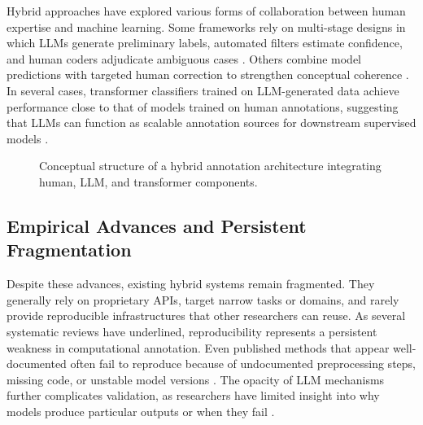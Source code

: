 \documentclass[12pt]{article}
\begin{document}
Hybrid approaches have explored various forms of collaboration between human expertise and machine learning. Some frameworks rely on multi-stage designs in which LLMs generate preliminary labels, automated filters estimate confidence, and human coders adjudicate ambiguous cases \parencite{wang_etal24a}. Others combine model predictions with targeted human correction to strengthen conceptual coherence \parencite{dreier_etal25}. In several cases, transformer classifiers trained on LLM-generated data achieve performance close to that of models trained on human annotations, suggesting that LLMs can function as scalable annotation sources for downstream supervised models \parencite{heseltineLargeLanguageModels2024, pangakisKnowledgeDistillationAutomated2024}. 

\begin{figure}[t!]
\centering
{}
\caption{Conceptual structure of a hybrid annotation architecture integrating human, LLM, and transformer components.}
\label{fig:hybrid_architecture}
\end{figure}

\subsection{Empirical Advances and Persistent Fragmentation}

Despite these advances, existing hybrid systems remain fragmented. They generally rely on proprietary APIs, target narrow tasks or domains, and rarely provide reproducible infrastructures that other researchers can reuse. As several systematic reviews have underlined, reproducibility represents a persistent weakness in computational annotation. Even published methods that appear well-documented often fail to reproduce because of undocumented preprocessing steps, missing code, or unstable model versions \parencite{chen_etal23, weber_reichardt23}. The opacity of LLM mechanisms further complicates validation, as researchers have limited insight into why models produce particular outputs or when they fail \parencite{zhao_etal24}. 
\end{document}
